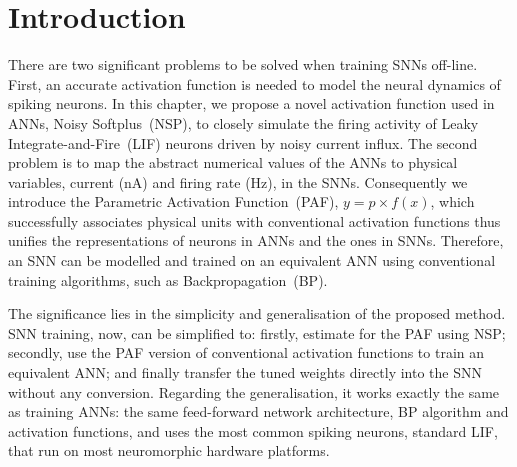 \section{Introduction}
\label{sec:intro_NSP}
There are two significant problems to be solved when training SNNs off-line.
First, an accurate activation function is needed to model the neural dynamics of spiking neurons.
In this chapter, we propose a novel activation function used in ANNs, Noisy Softplus~(NSP), to closely simulate the firing activity of Leaky Integrate-and-Fire~(LIF) neurons driven by noisy current influx.
The second problem is to map the abstract numerical values of the ANNs to physical variables, current (nA) and firing rate (Hz), in the SNNs.
Consequently we introduce the Parametric Activation Function~(PAF), $y = p \times f(x)$, which successfully associates physical units with conventional activation functions thus unifies the representations of neurons in ANNs and the ones in SNNs.
Therefore, an SNN can be modelled and trained on an equivalent ANN using conventional training algorithms, such as Backpropagation~(BP).

The significance lies in the simplicity and generalisation of the proposed method.
SNN training, now, can be simplified to: firstly, estimate \DIFdelbegin {}\DIFdelend \DIFaddbegin {}\DIFaddend for the PAF using NSP; secondly, use the PAF version of conventional activation functions to train an equivalent ANN; and finally transfer the tuned weights directly into the SNN without any conversion.
Regarding the generalisation, it works exactly the same as training ANNs: the same feed-forward network architecture, BP algorithm and activation functions, and uses the most common spiking neurons, standard LIF, that run on most neuromorphic hardware platforms.

